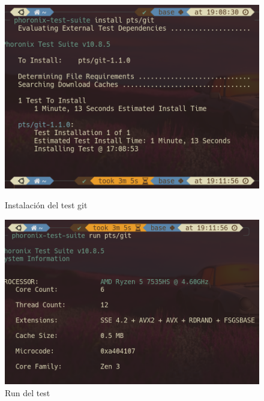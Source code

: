 \begin{itemize}
    \begin{figure}[H]
        \centering
        \begin{minipage}{0.45\textwidth}
            \centering
            \includegraphics[width=\textwidth]{images/Bloque2/personal-phoronix-1.png}
            \caption{Instalación del test git}
            \label{fig:image1}
        \end{minipage}
        \hfill
        \begin{minipage}{0.45\textwidth}
            \centering
            \includegraphics[width=\textwidth]{images/Bloque2/personal-phoronix-2.png}
            \caption{Run del test}
            \label{fig:image2}
        \end{minipage}
    \end{figure}
    \begin{figure}[H]
        \centering

\end{figure}
\end{itemize}
